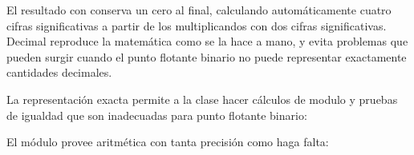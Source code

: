 \documentclass[a5paper,10pt,spanish]{sphinxmanual}
\begin{document}
\sphinxAtStartPar
El resultado con  conserva un cero al final, calculando automáticamente cuatro cifras significativas a partir de los multiplicandos con dos cifras significativas.  Decimal reproduce la matemática como se la hace a mano, y evita problemas que pueden surgir cuando el punto flotante binario no puede representar exactamente cantidades decimales.

\sphinxAtStartPar
La representación exacta permite a la clase  hacer cálculos de modulo y pruebas de igualdad que son inadecuadas para punto flotante binario:

\begin{sphinxVerbatim}[commandchars=\\\{\}]
  
  

\PYG{p}{[}\PYG{p}{]}  
\PYG{p}{[}\PYG{p}{]}  
\end{sphinxVerbatim}

\sphinxAtStartPar
El módulo  provee aritmética con tanta precisión como haga falta:

\begin{sphinxVerbatim}[commandchars=\\\{\}]
  
  
\end{sphinxVerbatim}
\end{document}

